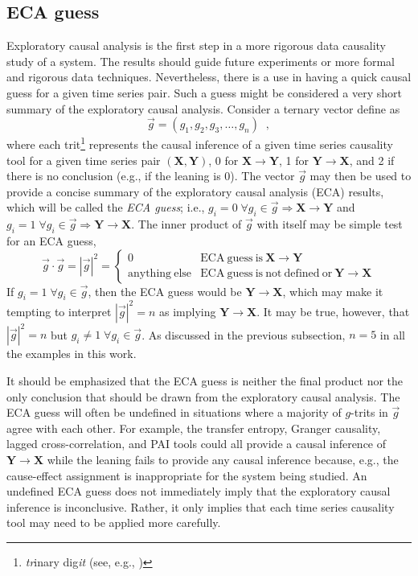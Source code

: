 \documentclass{article}[10pt]
\begin{document}
\subsection{ECA guess}
Exploratory causal analysis is the first step in a more rigorous data causality study of a system.  The results should guide future experiments or more formal and rigorous data techniques.  Nevertheless, there is a use in having a quick causal guess for a given time series pair.  Such a guess might be considered a very short summary of the exploratory causal analysis.  Consider a ternary vector define as
\begin{equation}
\vec{g} = (g_1,g_2,g_3,\ldots,g_n)\;\;,
\end{equation}
where each trit\footnote{{\em tr}inary dig{\em it} (see, e.g., \cite{Hayes2001})} represents the causal inference of a given time series causality tool for a given time series pair $(\mathbf{X},\mathbf{Y})$, 0 for $\mathbf{X}\rightarrow\mathbf{Y}$, 1 for $\mathbf{Y}\rightarrow\mathbf{X}$, and 2 if there is no conclusion (e.g., if the leaning is 0).  The vector $\vec{g}$ may then be used to provide a concise summary of the exploratory causal analysis (ECA) results, which will be called the {\em ECA guess}; i.e., $g_i = 0\;\forall g_i\in\vec{g}\Rightarrow\mathbf{X}\rightarrow\mathbf{Y}$ and $g_i = 1\;\forall g_i\in\vec{g}\Rightarrow\mathbf{Y}\rightarrow\mathbf{X}$.    The inner product of $\vec{g}$ with itself may be simple test for an ECA guess,
\begin{equation}
\vec{g}\cdot\vec{g} = |\vec{g}|^2 = \left\{
  \begin{array}{lr}
    0 & \mathrm{ECA\ guess\ is\ }\mathbf{X}\rightarrow\mathbf{Y}\\
    \mathrm{anything\ else} & \mathrm{ECA\ guess\ is\ not\ defined\ or\ }\mathbf{Y}\rightarrow\mathbf{X}
  \end{array}
\right.
\end{equation}
If $g_i = 1\;\forall g_i\in\vec{g}$, then the ECA guess would be $\mathbf{Y}\rightarrow\mathbf{X}$, which may make it tempting to interpret $|\vec{g}|^2=n$ as implying $\mathbf{Y}\rightarrow\mathbf{X}$.  It may be true, however, that $|\vec{g}|^2=n$ but $g_i \neq 1\;\forall g_i\in\vec{g}$.  As discussed in the previous subsection, $n=5$ in all the examples in this work.

It should be emphasized that the ECA guess is neither the final product nor the only conclusion that should be drawn from the exploratory causal analysis.  The ECA guess will often be undefined in situations where a majority of $g$-trits in $\vec{g}$ agree with each other.  For example, the transfer entropy, Granger causality, lagged cross-correlation, and PAI tools could all provide a causal inference of $\mathbf{Y}\rightarrow\mathbf{X}$ while the leaning fails to provide any causal inference because, e.g., the cause-effect assignment is inappropriate for the system being studied.  An undefined ECA guess does not immediately imply that the exploratory causal inference is inconclusive.  Rather, it only implies that each time series causality tool may need to be applied more carefully.  
\end{document}
